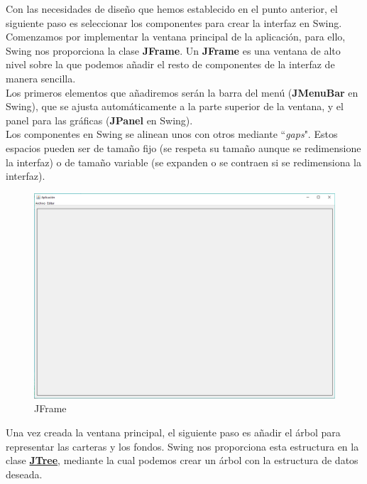 \documentclass[12pt, a4paper]{article}
\begin{document}
Con las necesidades de diseño que hemos establecido en el punto anterior, el siguiente paso es seleccionar los componentes para crear la interfaz en Swing.
\\

Comenzamos por implementar la ventana principal de la aplicación, para ello, Swing nos proporciona la clase \textbf{JFrame}. Un \textbf{JFrame} es una ventana de alto nivel sobre la que podemos añadir el resto de componentes de la interfaz de manera sencilla.
\\

Los primeros elementos que añadiremos serán la barra del menú (\textbf{JMenuBar} en Swing), que se ajusta automáticamente a la parte superior de la ventana, y el panel para las gráficas (\textbf{JPanel} en Swing).
\\

Los componentes en Swing se alinean unos con otros mediante ``\textit{gaps}". Estos espacios pueden ser de tamaño fijo (se respeta su tamaño aunque se redimensione la interfaz) o de tamaño variable (se expanden o se contraen si se redimensiona la interfaz).

\begin{figure}[htbp]
	\centering
	\includegraphics[width=\textwidth]{figuras/gui1.PNG}
	\caption{JFrame}
	\label{fig:gui1}
	\end {figure}


\newpage


Una vez creada la ventana principal, el siguiente paso es añadir el árbol para representar las carteras y los fondos. Swing nos proporciona esta estructura en la clase  \href{JTree}{\textbf{JTree}}, mediante la cual podemos crear un árbol con la estructura de datos deseada.\\
\end{document}

